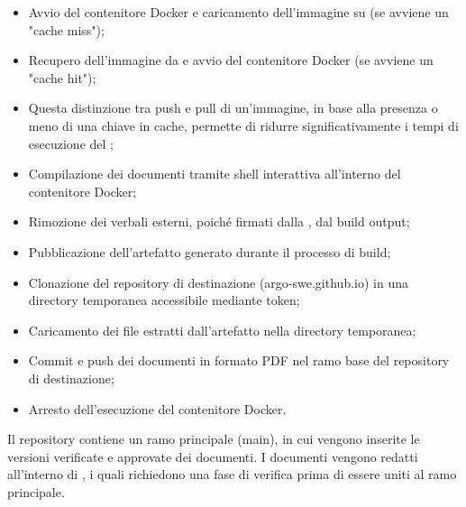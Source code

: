 \begin{itemize}
\begin{itemize}
    \item Avvio del contenitore Docker e caricamento dell'immagine su  (se avviene un "cache miss");
    \item Recupero dell'immagine da  e avvio del contenitore Docker (se avviene un "cache hit");
    \item Questa distinzione tra push e pull di un'immagine, in base alla presenza o meno di una chiave in cache, permette di ridurre significativamente i tempi di esecuzione del ;
    \item Compilazione dei documenti tramite shell interattiva all'interno del contenitore Docker;
    \item Rimozione dei verbali esterni, poiché firmati dalla , dal build output;
    \item Pubblicazione dell'artefatto generato durante il processo di build;
    \item Clonazione del repository di destinazione (argo-swe.github.io) in una directory temporanea accessibile mediante token;
    \item Caricamento dei file estratti dall'artefatto nella directory temporanea;
    \item Commit e push dei documenti in formato PDF nel ramo base del repository di destinazione;
    \item Arresto dell'esecuzione del contenitore Docker.
  \end{itemize}
\end{itemize}

\vspace{0.5\baselineskip}
\par Il repository contiene un ramo principale (main), in cui vengono inserite le versioni verificate e approvate dei documenti. I documenti vengono redatti all'interno di , i quali richiedono una fase di verifica prima di essere uniti al ramo principale.

